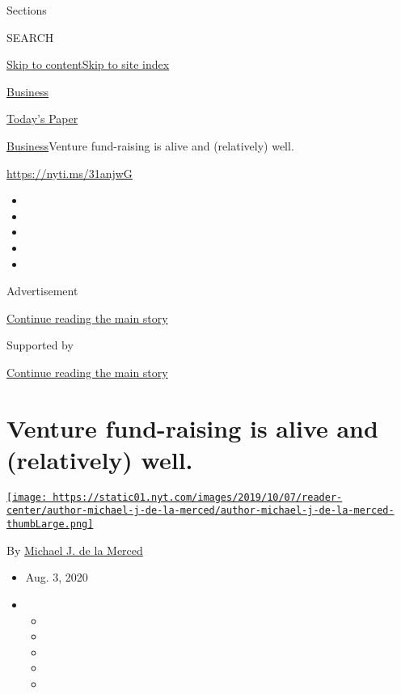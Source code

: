Sections

SEARCH

\protect\hyperlink{site-content}{Skip to
content}\protect\hyperlink{site-index}{Skip to site index}

\href{https://www.nytimes.com/section/business}{Business}

\href{https://myaccount.nytimes.com/auth/login?response_type=cookie\&client_id=vi}{}

\href{https://www.nytimes.com/section/todayspaper}{Today's Paper}

\href{/section/business}{Business}\textbar{}Venture fund-raising is
alive and (relatively) well.

\url{https://nyti.ms/31anjwG}

\begin{itemize}
\item
\item
\item
\item
\item
\end{itemize}

Advertisement

\protect\hyperlink{after-top}{Continue reading the main story}

Supported by

\protect\hyperlink{after-sponsor}{Continue reading the main story}

\hypertarget{venture-fund-raising-is-alive-and-relatively-well}{%
\section{Venture fund-raising is alive and (relatively)
well.}\label{venture-fund-raising-is-alive-and-relatively-well}}

\href{https://www.nytimes.com/by/michael-j-de-la-merced}{\texttt{[image: https://static01.nyt.com/images/2019/10/07/reader-center/author-michael-j-de-la-merced/author-michael-j-de-la-merced-thumbLarge.png]}}

By \href{https://www.nytimes.com/by/michael-j-de-la-merced}{Michael J.
de la Merced}

\begin{itemize}
\item
  Aug. 3, 2020
\item
  \begin{itemize}
  \item
  \item
  \item
  \item
  \item
  \end{itemize}
\end{itemize}

